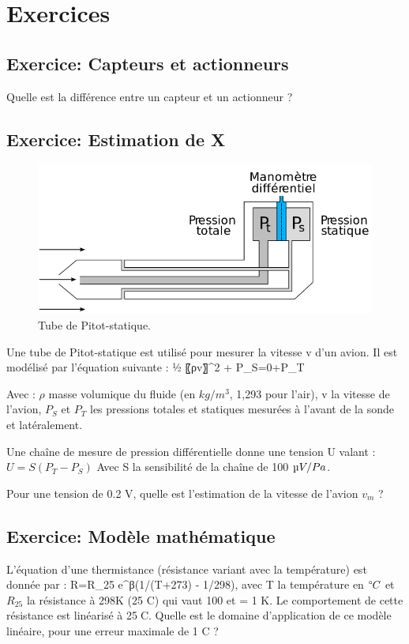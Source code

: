 \documentclass[main.tex]{subfiles}
\begin{document}
\iftrue

\pagebreak

\section{Exercices}

\subsection{Exercice: Capteurs et actionneurs}
Quelle est la différence entre un capteur et un actionneur ?

\subsection{Exercice: Estimation de X}

\begin{figure}[h]
    \centering
    \includegraphics[width=13cm]{assets/figures/2_Ex_Pitot.png}
    \caption{Tube de Pitot-statique.}\vspace{5mm}
    \label{fig:2_Ex_Pitot}
    \centering
\end{figure}

Une tube de Pitot-statique est utilisé pour mesurer la vitesse v d’un avion. Il est modélisé par l’équation suivante :
 1⁄2 〖ρv〗^2  + P_S=0+P_T

Avec : $\rho$ masse volumique du fluide (en $kg/m^3$, 1,293 pour l'air), v la vitesse de l’avion, $P_S$ et $P_T$ les pressions totales et statiques mesurées à l’avant de la sonde et latéralement.

Une chaîne de mesure de pression différentielle donne une tension U valant :
 $U=S(P_T-P_S)$
Avec S la sensibilité de la chaîne de 100 $\micro V/Pa$.

Pour une tension de 0.2 V, quelle est l’estimation de la vitesse de l’avion $v_m$ ?

\subsection{Exercice: Modèle mathématique}
L’équation d’une thermistance (résistance variant avec la température) est donnée par :
 R=R_25  e^{β(1/(T+273) - 1/298)}, avec T la température en $\degree C$ et $R_{25}$ la résistance à 298K (25 \degree C) qui vaut 100 \Omega et \beta = 1 K.
Le comportement de cette résistance est linéarisé à 25C. Quelle est le domaine d’application de ce modèle linéaire, pour une erreur maximale de 1 \degree C ?
\end{document}
